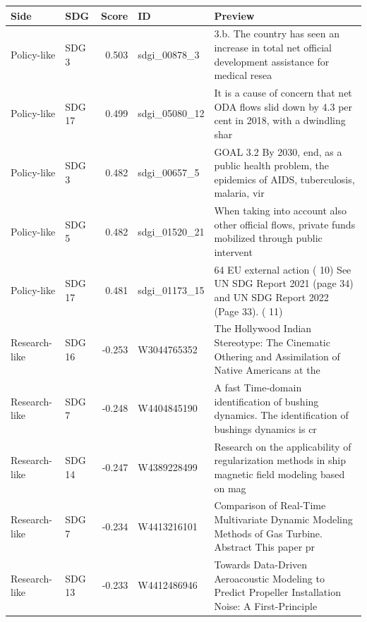 \begin{tabular}{llrp{}p{}}
\toprule
Side & SDG & Score & ID & Preview \\
\midrule
Policy-like & SDG 3 & 0.503 & sdgi\_00878\_3 & 3.b. The country has seen an increase in total net official development assistance for medical resea \\
Policy-like & SDG 17 & 0.499 & sdgi\_05080\_12 & It is a cause of concern that net ODA flows slid down by 4.3 per cent in 2018, with a dwindling shar \\
Policy-like & SDG 3 & 0.482 & sdgi\_00657\_5 & GOAL 3.2 By 2030, end, as a public health problem, the epidemics of AIDS, tuberculosis, malaria, vir \\
Policy-like & SDG 5 & 0.482 & sdgi\_01520\_21 & When taking into account also other official flows, private funds mobilized through public intervent \\
Policy-like & SDG 17 & 0.481 & sdgi\_01173\_15 & 64 EU external action ( 10) See UN SDG Report 2021 (page 34) and UN SDG Report 2022 (Page 33). ( 11) \\
\midrule
Research-like & SDG 16 & -0.253 & W3044765352 & The Hollywood Indian Stereotype: The Cinematic Othering and Assimilation of Native Americans at the  \\
Research-like & SDG 7 & -0.248 & W4404845190 & A fast Time-domain identification of bushing dynamics. The identification of bushings dynamics is cr \\
Research-like & SDG 14 & -0.247 & W4389228499 & Research on the applicability of regularization methods in ship magnetic field modeling based on mag \\
Research-like & SDG 7 & -0.234 & W4413216101 & Comparison of Real-Time Multivariate Dynamic Modeling Methods of Gas Turbine. Abstract This paper pr \\
Research-like & SDG 13 & -0.233 & W4412486946 & Towards Data-Driven Aeroacoustic Modeling to Predict Propeller Installation Noise: A First-Principle \\
\bottomrule
\end{tabular}
